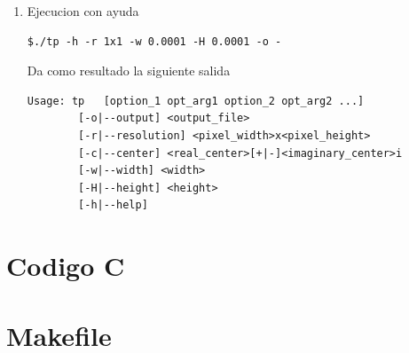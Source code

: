 \documentclass[10pt,spanish,a4paper,openany,notitlepage]{article}
\newcommand{\captionlisting}[2][]{%
}
\begin{document}
\begin{enumerate}
\item Ejecucion con ayuda
\begin{framed}
\begin{verbatim}$./tp -h -r 1x1 -w 0.0001 -H 0.0001 -o -\end{verbatim}
\end{framed}
Da como resultado la siguiente salida
\begin{framed}
\begin{verbatim}Usage: tp 	[option_1 opt_arg1 option_2 opt_arg2 ...]
		[-o|--output] <output_file>
		[-r|--resolution] <pixel_width>x<pixel_height>
		[-c|--center] <real_center>[+|-]<imaginary_center>i
		[-w|--width] <width>
		[-H|--height] <height>
		[-h|--help]\end{verbatim}
\end{framed}

\end{enumerate}




\newpage
\appendix
\section{Codigo C}

\captionlisting{tp.c}

\newpage
\section{Makefile}



\newpage
\begin{thebibliography}{99} %


\end{thebibliography}
\end{document}
